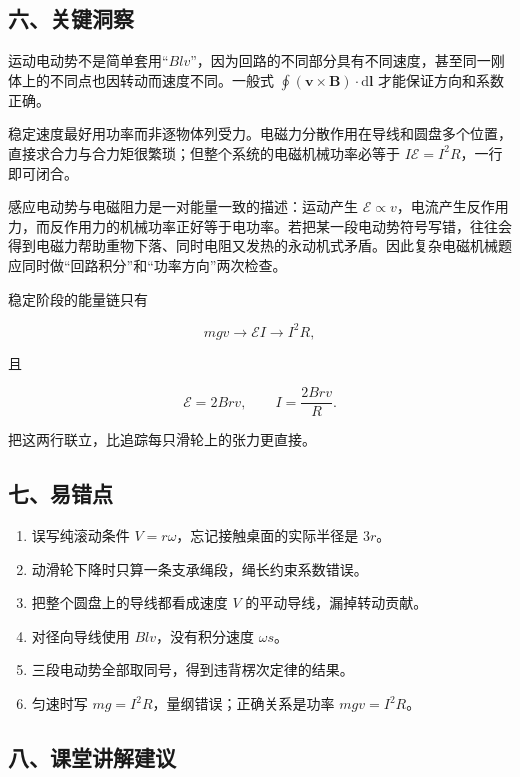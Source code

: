 \documentclass[12pt,a4paper,UTF8]{ctexart}
\newcommand{\tightlist}{\setlength{\itemsep}{0pt}\setlength{\parskip}{0pt}}
\begin{document}
\subsection{六、关键洞察}\label{ux516dux5173ux952eux6d1eux5bdf-4}

运动电动势不是简单套用``\(Blv\)''，因为回路的不同部分具有不同速度，甚至同一刚体上的不同点也因转动而速度不同。一般式
\(\oint(\bm v\times\bm B)\cdot\mathrm d\bm l\) 才能保证方向和系数正确。

稳定速度最好用功率而非逐物体列受力。电磁力分散作用在导线和圆盘多个位置，直接求合力与合力矩很繁琐；但整个系统的电磁机械功率必等于
\(I\mathcal E=I^2R\)，一行即可闭合。

感应电动势与电磁阻力是一对能量一致的描述：运动产生
\(\mathcal E\propto v\)，电流产生反作用力，而反作用力的机械功率正好等于电功率。若把某一段电动势符号写错，往往会得到电磁力帮助重物下落、同时电阻又发热的永动机式矛盾。因此复杂电磁机械题应同时做``回路积分''和``功率方向''两次检查。

稳定阶段的能量链只有

\[mgv\longrightarrow \mathcal EI\longrightarrow I^2R,\]

且

\[\mathcal E=2Brv,
\qquad I=\frac{2Brv}{R}.\]

把这两行联立，比追踪每只滑轮上的张力更直接。

\subsection{七、易错点}\label{ux4e03ux6613ux9519ux70b9-4}

\begin{enumerate}
\def\labelenumi{\arabic{enumi}.}
\tightlist
\item
  误写纯滚动条件 \(V=r\omega\)，忘记接触桌面的实际半径是 \(3r\)。
\item
  动滑轮下降时只算一条支承绳段，绳长约束系数错误。
\item
  把整个圆盘上的导线都看成速度 \(V\) 的平动导线，漏掉转动贡献。
\item
  对径向导线使用 \(Blv\)，没有积分速度 \(\omega s\)。
\item
  三段电动势全部取同号，得到违背楞次定律的结果。
\item
  匀速时写 \(mg=I^2R\)，量纲错误；正确关系是功率 \(mgv=I^2R\)。
\end{enumerate}

\subsection{八、课堂讲解建议}\label{ux516bux8bfeux5802ux8bb2ux89e3ux5efaux8bae-4}
\end{document}
